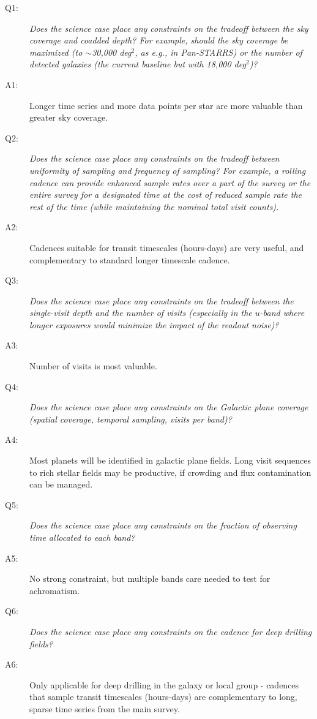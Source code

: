  \begin{description}
%
 \item[Q1:] {\it Does the science case place any constraints on the
 tradeoff between the sky coverage and coadded depth? For example, should
the sky coverage be maximized (to $\sim$30,000 deg$^2$, as e.g., in
 Pan-STARRS) or the number of detected galaxies (the current baseline but
with 18,000 deg$^2$)?}
%
\item[A1:] Longer time series and more data points per star are more valuable than greater sky coverage.
%
\item[Q2:] {\it Does the science case place any constraints on the
 tradeoff between uniformity of sampling and frequency of  sampling? For
 example, a rolling cadence can provide enhanced sample rates over a part
 of the survey or the entire survey for a designated time at the cost of
 reduced sample rate the rest of the time (while maintaining the nominal
 total visit counts).}
%
\item[A2:] Cadences suitable for transit timescales (hours-days) are very useful, and complementary to 
standard longer timescale cadence.
%
 \item[Q3:] {\it Does the science case place any constraints on the
 tradeoff between the single-visit depth and the number of visits
 (especially in the $u$-band where longer exposures would minimize the
 impact of the readout noise)?}
%
 \item[A3:] Number of visits is most valuable.
%
 \item[Q4:] {\it Does the science case place any constraints on the
 Galactic plane coverage (spatial coverage, temporal sampling, visits per
 band)?}
%
 \item[A4:] Most planets will be identified in galactic plane fields. Long visit sequences to
rich stellar fields may be productive, if crowding and flux contamination can be managed.
%
 \item[Q5:] {\it Does the science case place any constraints on the
 fraction of observing time allocated to each band?}
%
 \item[A5:] No strong constraint, but multiple bands care needed to test for achromatism.
%
 \item[Q6:] {\it Does the science case place any constraints on the
 cadence for deep drilling fields?}
%
 \item[A6:] Only applicable for deep drilling in the galaxy or local group - cadences that sample transit timescales (hours-days)
are complementary to long, sparse time series from the main survey.

\end{description}
